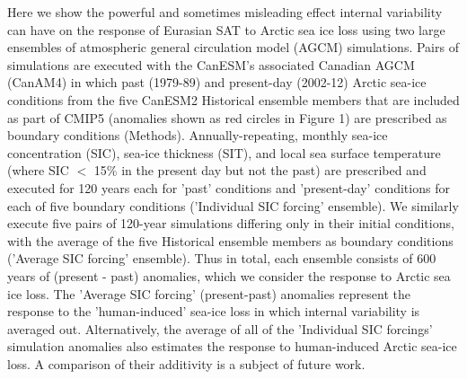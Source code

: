 \documentclass[grl]{AGUTeX}  %
\begin{document}
\begin{article}
Here we show the powerful and sometimes misleading effect internal variability can have on the response of Eurasian SAT to Arctic sea ice loss using two large ensembles of atmospheric general circulation model (AGCM) simulations. Pairs of simulations are executed with the CanESM's associated Canadian AGCM (CanAM4) in which past (1979-89) and present-day (2002-12) Arctic sea-ice conditions from the five CanESM2 Historical ensemble members that are included as part of CMIP5 (anomalies shown as red circles in Figure 1) are prescribed as boundary conditions (Methods). Annually-repeating, monthly sea-ice concentration (SIC), sea-ice thickness (SIT), and local sea surface temperature (where SIC $<$ 15\% in the present day but not the past) are prescribed and executed for 120 years each for 'past' conditions and 'present-day' conditions for each of five boundary conditions ('Individual SIC forcing' ensemble). We similarly execute five pairs of 120-year simulations differing only in their initial conditions, with the average of the five Historical ensemble members as boundary conditions ('Average SIC forcing' ensemble). Thus in total, each ensemble consists of 600 years of (present - past) anomalies, which we consider the response to Arctic sea ice loss. The 'Average SIC forcing' (present-past) anomalies represent the response to the 'human-induced' sea-ice loss in which internal variability is averaged out. Alternatively, the average of all of the 'Individual SIC forcings' simulation anomalies also estimates the response to human-induced Arctic sea-ice loss. A comparison of their additivity is a subject of future work. %


\end{article}
\end{document}
